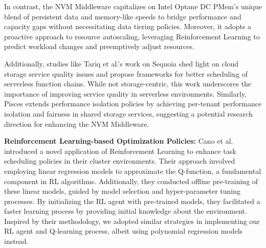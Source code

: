 In contrast, the NVM Middleware capitalizes on Intel Optane DC PMem's unique blend of persistent data and memory-like speeds to bridge performance and capacity gaps without necessitating data tiering policies. Moreover, it adopts a proactive approach to resource autoscaling, leveraging Reinforcement Learning to predict workload changes and preemptively adjust resources.

Additionally, studies like Tariq et al.'s work on Sequoia \cite{tariq2020sequoia} shed light on cloud storage service quality issues and propose frameworks for better scheduling of serverless function chains. While not storage-centric, this work underscores the importance of improving service quality in serverless environments. Similarly, Pisces \cite{180275} extends performance isolation policies by achieving per-tenant performance isolation and fairness in shared storage services, suggesting a potential research direction for enhancing the NVM Middleware.

\textbf{Reinforcement Learning-based Optimization Policies:} Cano et al. \cite{cano2017curator} introduced a novel application of Reinforcement Learning to enhance task scheduling policies in their cluster environments. Their approach involved employing linear regression models to approximate the Q-function, a fundamental component in RL algorithms. Additionally, they conducted offline pre-training of these linear models, guided by model selection and hyper-parameter tuning processes. By initializing the RL agent with pre-trained models, they facilitated a faster learning process by providing initial knowledge about the environment. Inspired by their methodology, we adopted similar strategies in implementing our RL agent and Q-learning process, albeit using polynomial regression models instead.





